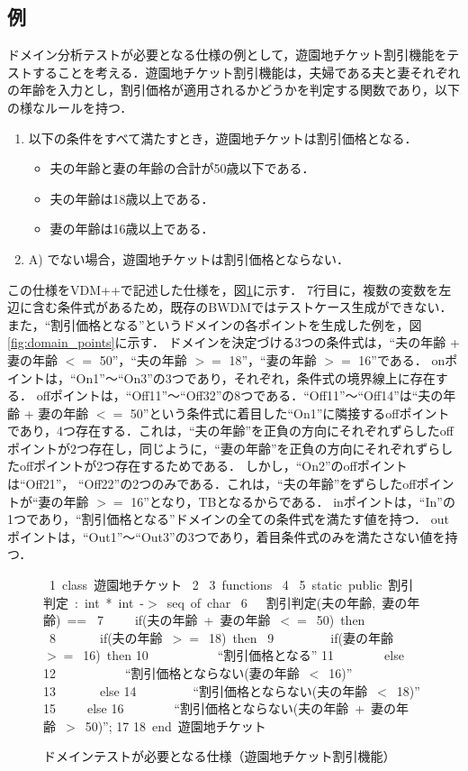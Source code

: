 \documentclass[uplatex, report, a4j, 10pt]{jsbook}
\begin{document}
\subsection{例}
ドメイン分析テストが必要となる仕様の例として，遊園地チケット割引機能をテストすることを考える．遊園地チケット割引機能は，夫婦である夫と妻それぞれの年齢を入力とし，割引価格が適用されるかどうかを判定する関数であり，以下の様なルールを持つ．
\begin{enumerate}
	\renewcommand{\labelenumi}{\Alph{enumi})}
	\item\label{enu:yuenchi} 以下の条件をすべて満たすとき，遊園地チケットは割引価格となる．
	\begin{itemize}
		\item 夫の年齢と妻の年齢の合計が50歳以下である．
		\item 夫の年齢は18歳以上である．
		\item 妻の年齢は16歳以上である．
	\end{itemize}
	\item A) でない場合，遊園地チケットは割引価格とならない．
\end{enumerate}
この仕様をVDM++で記述した仕様を，図\ref{fig:vdm_park}に示す．
7行目に，複数の変数を左辺に含む条件式があるため，既存のBWDMではテストケース生成ができない．
また，“割引価格となる”というドメインの各ポイントを生成した例を，図\ref{fig:domain_points}に示す．
ドメインを決定づける3つの条件式は，“夫の年齢 + 妻の年齢 $<=$ 50”，“夫の年齢 $>=$ 18”，“妻の年齢 $>=$ 16”である．
onポイントは，“On1”〜“On3”の3つであり，それぞれ，条件式の境界線上に存在する．
offポイントは，“Off11”〜“Off32”の8つである．“Off11”〜“Off14”は“夫の年齢 + 妻の年齢 $<=$ 50”という条件式に着目した“On1”に隣接するoffポイントであり，4つ存在する．これは，“夫の年齢”を正負の方向にそれぞれずらしたoffポイントが2つ存在し，同じように，“妻の年齢”を正負の方向にそれぞれずらしたoffポイントが2つ存在するためである．
しかし，“On2”のoffポイントは“Off21”， “Off22”の2つのみである．これは，“夫の年齢”をずらしたoffポイントが“妻の年齢 $>=$ 16”となり，TBとなるからである．
inポイントは，“In”の1つであり，“割引価格となる”ドメインの全ての条件式を満たす値を持つ．
outポイントは，“Out1”〜“Out3”の3つであり，着目条件式のみを満たさない値を持つ．

\begin{figure}[tb]
	\vbox{
		\hbox{ 1 class 遊園地チケット}
		\hbox{ 2}
		\hbox{ 3 functions}
		\hbox{ 4}
		\hbox{ 5 static public 割引判定 : int * int -$>$ seq of char}
		\hbox{ 6 \ \ 割引判定(夫の年齢, 妻の年齢) ==}
		\hbox{ 7 \ \ \ \ if(夫の年齢 + 妻の年齢 $<=$ 50) then}
		\hbox{ 8 \ \ \ \ \ \ if(夫の年齢 $>=$ 18) then}
		\hbox{ 9 \ \ \ \ \ \ \ \ if(妻の年齢 $>=$ 16) then}
		\hbox{10 \ \ \ \ \ \ \ \ \ \ ``割引価格となる''}
		\hbox{11 \ \ \ \ \ \ \ else}
		\hbox{12 \ \ \ \ \ \ \ \ \ \ ``割引価格とならない(妻の年齢 $<$ 16)''}
		\hbox{13 \ \ \ \ \ \ else}
		\hbox{14 \ \ \ \ \ \ \ \ ``割引価格とならない(夫の年齢 $<$ 18)''}
		\hbox{15 \ \ \ \ else}
		\hbox{16 \ \ \ \ \ \  \  ``割引価格とならない(夫の年齢 + 妻の年齢 $>$ 50)'';}
		\hbox{17}
		\hbox{18 end 遊園地チケット}
	}
	\centerline{}
	\caption{ドメインテストが必要となる仕様（遊園地チケット割引機能）}
	\label{fig:vdm_park}
\end{figure}
\end{document}
